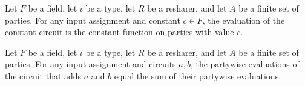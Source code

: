 \begin{theorem}
\label{TCSlib.MPC.BGW.bgwEval_const}
\leanok
{}
Let $F$ be a field, let $\iota$ be a type, let $R$ be a resharer, and let $A$ be a
finite set of parties. For any input assignment and constant $c\in F$, the evaluation of
the constant circuit is the constant function on parties with value $c$.
\end{theorem}

\begin{theorem}
\label{TCSlib.MPC.BGW.bgwEval_add}
\leanok
{}
Let $F$ be a field, let $\iota$ be a type, let $R$ be a resharer, and let $A$ be a
finite set of parties. For any input assignment and circuits $a,b$, the partywise
evaluations of the circuit that adds $a$ and $b$ equal the sum of their partywise
evaluations.
\end{theorem}

